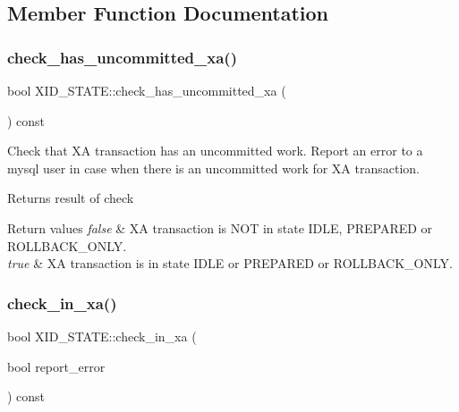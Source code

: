 \subsection{Member Function Documentation}
\mbox{\label{classXID__STATE_ac5780b7f325ef65c9c395856c8fa2e23}} 
\subsubsection{\texorpdfstring{check\+\_\+has\+\_\+uncommitted\+\_\+xa()}{check\_has\_uncommitted\_xa()}}
{\footnotesize\ttfamily bool X\+I\+D\+\_\+\+S\+T\+A\+T\+E\+::check\+\_\+has\+\_\+uncommitted\+\_\+xa (\begin{DoxyParamCaption}{ }\end{DoxyParamCaption}) const}

Check that XA transaction has an uncommitted work. Report an error to a mysql user in case when there is an uncommitted work for XA transaction.

\begin{DoxyReturn}{Returns}
result of check 
\end{DoxyReturn}

\begin{DoxyRetVals}{Return values}
{\em false} & XA transaction is N\+OT in state I\+D\+LE, P\+R\+E\+P\+A\+R\+ED or R\+O\+L\+L\+B\+A\+C\+K\+\_\+\+O\+N\+LY. \\
\hline
{\em true} & XA transaction is in state I\+D\+LE or P\+R\+E\+P\+A\+R\+ED or R\+O\+L\+L\+B\+A\+C\+K\+\_\+\+O\+N\+LY. \\
\hline
\end{DoxyRetVals}
\mbox{\label{classXID__STATE_ae60d37b094a4965d5d8de7b8c050d85d}} 
\subsubsection{\texorpdfstring{check\+\_\+in\+\_\+xa()}{check\_in\_xa()}}
{\footnotesize\ttfamily bool X\+I\+D\+\_\+\+S\+T\+A\+T\+E\+::check\+\_\+in\+\_\+xa (\begin{DoxyParamCaption}\item[{bool}]{report\+\_\+error }\end{DoxyParamCaption}) const}

